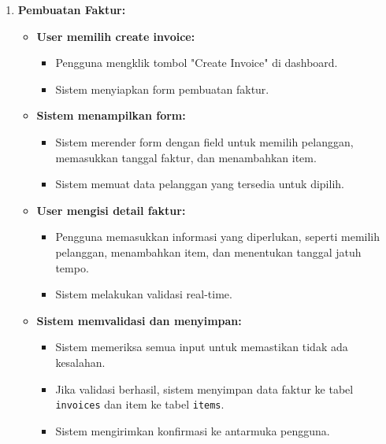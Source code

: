\documentclass[a4paper]{report}
\begin{document}
\begin{enumerate}
\item \textbf{Pembuatan Faktur:}
    \begin{itemize}
    \item \textbf{User memilih create invoice:}
        \begin{itemize}
        \item Pengguna mengklik tombol "Create Invoice" di dashboard.
        \item Sistem menyiapkan form pembuatan faktur.
        \end{itemize}
    \item \textbf{Sistem menampilkan form:}
        \begin{itemize}
        \item Sistem merender form dengan field untuk memilih pelanggan, memasukkan 
        tanggal faktur, dan menambahkan item.
        \item Sistem memuat data pelanggan yang tersedia untuk dipilih.
        \end{itemize}
    \item \textbf{User mengisi detail faktur:}
        \begin{itemize}
        \item Pengguna memasukkan informasi yang diperlukan, seperti memilih pelanggan, 
        menambahkan item, dan menentukan tanggal jatuh tempo.
        \item Sistem melakukan validasi real-time.
        \end{itemize}
    \item \textbf{Sistem memvalidasi dan menyimpan:}
        \begin{itemize}
        \item Sistem memeriksa semua input untuk memastikan tidak ada kesalahan.
        \item Jika validasi berhasil, sistem menyimpan data faktur ke tabel 
        \texttt{invoices} dan item ke tabel \texttt{items}.
        \item Sistem mengirimkan konfirmasi ke antarmuka pengguna.
        \end{itemize}
    \end{itemize}


\end{enumerate}
\end{document}
